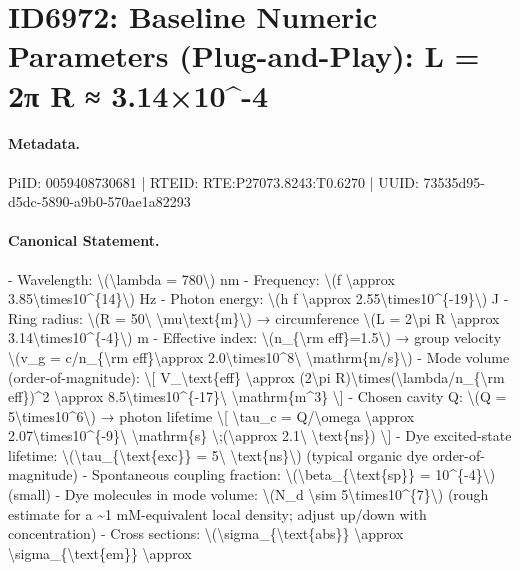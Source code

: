 \section*{ID6972: Baseline Numeric Parameters (Plug-and-Play): L = 2π R ≈ 3.14×10\textasciicircum{}-4}
\paragraph{Metadata.}
PiID: 0059408730681 | RTEID: RTE:P27073.8243:T0.6270 | UUID: 73535d95-d5dc-5890-a9b0-570ae1a82293

\paragraph{Canonical Statement.}
- Wavelength: \textbackslash{}(\textbackslash{}lambda = 780\textbackslash{}) nm - Frequency: \textbackslash{}(f \textbackslash{}approx 3.85\textbackslash{}times10\textasciicircum{}\{14\}\textbackslash{}) Hz - Photon energy: \textbackslash{}(h f \textbackslash{}approx 2.55\textbackslash{}times10\textasciicircum{}\{-19\}\textbackslash{}) J - Ring radius: \textbackslash{}(R = 50\textbackslash{} \textbackslash{}mu\textbackslash{}text\{m\}\textbackslash{}) → circumference \textbackslash{}(L = 2\textbackslash{}pi R \textbackslash{}approx 3.14\textbackslash{}times10\textasciicircum{}\{-4\}\textbackslash{}) m - Effective index: \textbackslash{}(n\_\{\textbackslash{}rm eff\}=1.5\textbackslash{}) → group velocity \textbackslash{}(v\_g = c/n\_\{\textbackslash{}rm eff\}\textbackslash{}approx 2.0\textbackslash{}times10\textasciicircum{}8\textbackslash{} \textbackslash{}mathrm\{m/s\}\textbackslash{}) - Mode volume (order-of-magnitude): \textbackslash{}[ V\_\textbackslash{}text\{eff\} \textbackslash{}approx (2\textbackslash{}pi R)\textbackslash{}times(\textbackslash{}lambda/n\_\{\textbackslash{}rm eff\})\textasciicircum{}2 \textbackslash{}approx 8.5\textbackslash{}times10\textasciicircum{}\{-17\}\textbackslash{} \textbackslash{}mathrm\{m\textasciicircum{}3\} \textbackslash{}] - Chosen cavity Q: \textbackslash{}(Q = 5\textbackslash{}times10\textasciicircum{}6\textbackslash{}) → photon lifetime \textbackslash{}[ \textbackslash{}tau\_c = Q/\textbackslash{}omega \textbackslash{}approx 2.07\textbackslash{}times10\textasciicircum{}\{-9\}\textbackslash{} \textbackslash{}mathrm\{s\} \textbackslash{};(\textbackslash{}approx 2.1\textbackslash{} \textbackslash{}text\{ns\}) \textbackslash{}] - Dye excited-state lifetime: \textbackslash{}(\textbackslash{}tau\_\{\textbackslash{}text\{exc\}\} = 5\textbackslash{} \textbackslash{}text\{ns\}\textbackslash{}) (typical organic dye order-of-magnitude) - Spontaneous coupling fraction: \textbackslash{}(\textbackslash{}beta\_\{\textbackslash{}text\{sp\}\} = 10\textasciicircum{}\{-4\}\textbackslash{}) (small) - Dye molecules in mode volume: \textbackslash{}(N\_d \textbackslash{}sim 5\textbackslash{}times10\textasciicircum{}\{7\}\textbackslash{}) (rough estimate for a \textasciitilde{}1 mM-equivalent local density; adjust up/down with concentration) - Cross sections: \textbackslash{}(\textbackslash{}sigma\_\{\textbackslash{}text\{abs\}\} \textbackslash{}approx \textbackslash{}sigma\_\{\textbackslash{}text\{em\}\} \textbackslash{}approx 